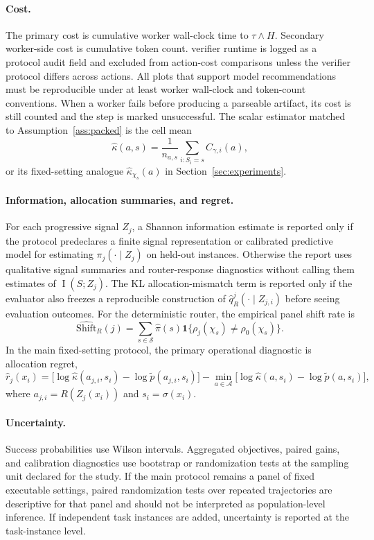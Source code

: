 \documentclass{article}
\DeclareMathOperator{\MI}{I}
\newcommand{\cA}{\mathcal{A}}
\newcommand{\cS}{\mathcal{S}}
\newcommand{\one}{\mathbf{1}}
\begin{document}
\paragraph{Cost.}
The primary cost is cumulative worker wall-clock time to $\tau\wedge H$.
Secondary worker-side cost is cumulative token count.
verifier runtime is logged as a protocol audit field and excluded from action-cost comparisons unless the verifier protocol differs across actions.
All plots that support model recommendations must be reproducible under at least worker wall-clock and token-count conventions.
When a worker fails before producing a parseable artifact, its cost is still counted and the step is marked unsuccessful.
The scalar estimator matched to Assumption~\ref{ass:packed} is the cell mean
\[
\hat\kappa(a,s)=\frac{1}{n_{a,s}}\sum_{i:S_i=s} C_{\gamma,i}(a),
\]
or its fixed-setting analogue $\hat\kappa_{\chi_s}(a)$ in Section~\ref{sec:experiments}.

\paragraph{Information, allocation summaries, and regret.}
For each progressive signal $Z_j$, a Shannon information estimate is reported only if the protocol predeclares a finite signal representation or calibrated predictive model for estimating $\pi_j(\cdot\mid Z_j)$ on held-out instances.
Otherwise the report uses qualitative signal summaries and router-response diagnostics without calling them estimates of $\MI(S;Z_j)$.
The KL allocation-mismatch term is reported only if the evaluator also freezes a reproducible construction of $\hat q_R^j(\cdot\mid Z_{j,i})$ before seeing evaluation outcomes.
For the deterministic router, the empirical panel shift rate is
\[
\widehat{\mathrm{Shift}}_R(j)=
\sum_{s\in\cS}\hat\pi(s)\one\{\rho_j(\chi_s)\ne\rho_0(\chi_s)\}.
\]
In the main fixed-setting protocol, the primary operational diagnostic is allocation regret,
\[
\hat r_j(x_i)
=
\bigl[\log\hat\kappa(a_{j,i},s_i)-\log\tilde p(a_{j,i},s_i)\bigr]
-
\min_{a\in\cA}
\bigl[\log\hat\kappa(a,s_i)-\log\tilde p(a,s_i)\bigr],
\]
where $a_{j,i}=R(Z_j(x_i))$ and $s_i=\sigma(x_i)$.

\paragraph{Uncertainty.}
Success probabilities use Wilson intervals.
Aggregated objectives, paired gains, and calibration diagnostics use bootstrap or randomization tests at the sampling unit declared for the study.
If the main protocol remains a panel of fixed executable settings, paired randomization tests over repeated trajectories are descriptive for that panel and should not be interpreted as population-level inference.
If independent task instances are added, uncertainty is reported at the task-instance level.
\end{document}

